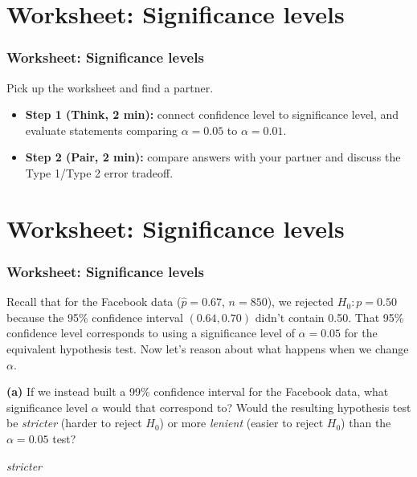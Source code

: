 \documentclass[t,compress,mathserif]{beamer}
\newcommand{\soln}[1]{\textit{#1}}
\begin{document}



\section{Worksheet: Significance levels}

\begin{frame}
\frametitle{Worksheet: Significance levels}

Pick up the worksheet and find a partner.

\begin{itemize}
    \item \textbf{Step 1 (Think, 2 min):} connect confidence level to significance level, and evaluate statements comparing $\alpha=0.05$ to $\alpha=0.01$.
    \item \textbf{Step 2 (Pair, 2 min):} compare answers with your partner and discuss the Type 1/Type 2 error tradeoff.
\end{itemize}

\end{frame}



\section{Worksheet: Significance levels}

\begin{frame}
\frametitle{Worksheet: Significance levels}
Recall that for the Facebook data ($\hat p = 0.67$, $n=850$), we rejected $H_0: p=0.50$ because the 95\% confidence interval $(0.64, 0.70)$ didn't contain 0.50. That 95\% confidence level corresponds to using a significance level of $\alpha = 0.05$ for the equivalent hypothesis test. Now let's reason about what happens when we change $\alpha$.

\textbf{(a)} If we instead built a 99\% confidence interval for the Facebook data, what significance level $\alpha$ would that correspond to? Would the resulting hypothesis test be \emph{stricter} (harder to reject $H_0$) or more \emph{lenient} (easier to reject $H_0$) than the $\alpha=0.05$ test?

\pause

\soln{\emph{stricter}}

\end{frame}
\end{document}
